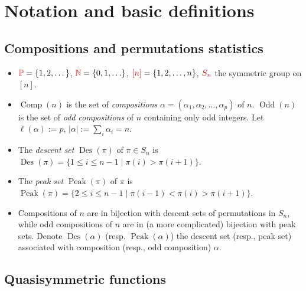 \documentclass[numbers=enddot,12pt,final,onecolumn,notitlepage]{scrartcl}%
\newcommand{\al}{\alpha}
\newcommand{\NN}{\mathbb{N}} %
\newcommand{\PP}{\mathbb{P}} %
\newcommand{\Des}{\operatorname{Des}}
\newcommand{\Odd}{\operatorname{Odd}}
\newcommand{\Comp}{\operatorname{Comp}}
\newcommand{\Peak}{\operatorname{Peak}}
\newcommand{\defn}[1]{{\color{darkred}\emph{#1}}}
\newcommand{\defnm}[1]{{\color{darkred} #1}}
\newcommand{\0}{\phantom{c}}
\let\sumnonlimits\sum
\renewcommand{\sum}{\sumnonlimits\limits}
\begin{document}
\section{Notation and basic definitions}


\subsection{Compositions and permutations statistics}

\begin{itemize}
\item $\defnm{\PP} =\left\{1,2,\dots\right\}$, $\defnm{\NN} = \left\{0,1,\ldots\right\}$, $\defnm{[n]} = \left\{1,2,\dots, n\right\}$, $\defnm{S_n}$ the symmetric group on $[n]$.

\item \defn{$\Comp(n)$} is the set of \defn{compositions} $\al = (\al_1, \al_2, \dots, \al_p)$ of $n$. \defn{$\Odd(n)$} is the set of \defn{odd compositions} of $n$ containing only odd integers.  Let $\ell(\al) := p$, $|\al| := \sum_i \al_i = n$.

\item The \defn{descent set} $\Des(\pi)$ of $\pi \in S_n$ is 
$\Des(\pi) = \{1\leq i\leq n-1 \mid \pi(i)>\pi(i+1)\}.$


\item The \defn{peak set} $\Peak(\pi)$ of $\pi$ is $
\Peak(\pi) = \{2\leq i\leq n-1 \mid \pi(i-1)<\pi(i)>\pi(i+1)\}.$

\item Compositions of $n$ are in bijection with descent sets of permutations in $S_n$, while odd compositions of $n$ are in (a more complicated) bijection with peak sets. Denote \defn{$\Des(\al)$} (resp. \defn{$\Peak(\al)$}) the descent set (resp., peak set) associated with composition (resp., odd composition) $\al$.

\end{itemize}

\subsection{Quasisymmetric functions}
\end{document}

